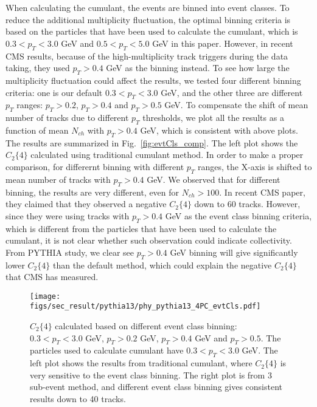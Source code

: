 When calculating the cumulant, the events are binned into event classes. To reduce the additional multiplicity fluctuation, the optimal binning criteria is based on the particles that have been used to calculate the cumulant, which is $0.3<p_{T}<3.0$ GeV and $0.5<p_{T}<5.0$ GeV in this paper. However, in recent CMS results, because of the high-multiplicity track triggers during the data taking, they used $p_{T}>0.4$ GeV as the binning instead. To see how large the multiplicity fluctuation could affect the results, we tested four different binning criteria: one is our default $0.3<p_{T}<3.0$ GeV, and the other three are different $p_{T}$ ranges: $p_{T}>0.2$, $p_{T}>0.4$ and $p_{T}>0.5$ GeV. To compensate the shift of mean number of tracks due to different $p_{T}$ thresholds, we plot all the results as a function of mean $N_{ch}$ with $p_{T}>0.4$ GeV, which is consistent with above plots. The results are summarized in Fig.~\ref{fig:evtCls_comp}. The left plot shows the $C_{2}\{4\}$ calculated using traditional cumulant method. In order to make a proper comparison, for differernt binning with different $p_{T}$ ranges, the X-axis is shifted to mean number of tracks with $p_{T}>0.4$ GeV. We observed that for different binning, the results are very different, even for $N_{ch}>100$. In recent CMS paper, they claimed that they observed a negative $C_{2}\{4\}$ down to 60 tracks. However, since they were using tracks with $p_{T}>0.4$ GeV as the event class binning criteria, which is different from the particles that have been used to calculate the cumulant, it is not clear whether such observation could indicate collectivity. From PYTHIA study, we clear see $p_{T}>0.4$ GeV binning will give significantly lower $C_{2}\{4\}$ than the default method, which could explain the negative $C_{2}\{4\}$ that CMS has measured.

\begin{figure}[H]
\centering
\texttt{[image: figs/sec\_result/pythia13/phy\_pythia13\_4PC\_evtCls.pdf]}
\caption{$C_{2}\{4\}$ calculated based on different event class binning: $0.3<p_{T}<3.0$ GeV, $p_{T}>0.2$ GeV, $p_{T}>0.4$ GeV and $p_{T}>0.5$. The particles used to calculate cumulant have $0.3<p_{T}<3.0$ GeV. The left plot shows the results from traditional cumulant, where $C_{2}\{4\}$ is very sensitive to the event class binning. The right plot is from 3 sub-event method, and different event class binning gives consistent results down to 40 tracks.}
\label{fig:phy_pythia13_4PC_evtCls}
\end{figure}


